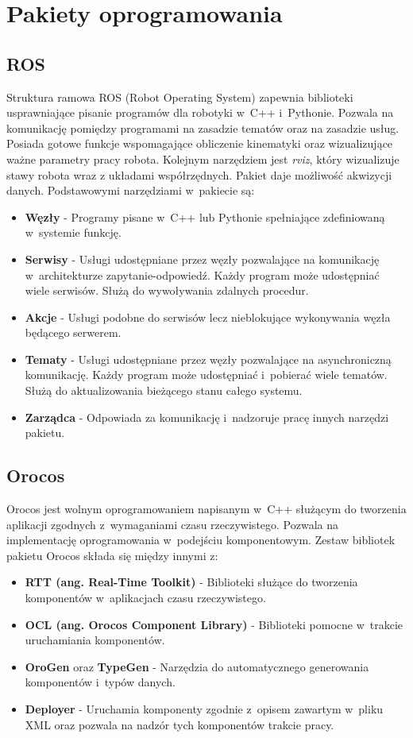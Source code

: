 	\section{Pakiety oprogramowania}
	\subsection{ROS}
	Struktura ramowa ROS (Robot Operating System)\cite{bib:ROS} zapewnia biblioteki usprawniające pisanie programów dla robotyki w~C++ i~Pythonie. Pozwala na komunikację pomiędzy programami na zasadzie tematów oraz na zasadzie usług. Posiada gotowe funkcje wspomagające obliczenie kinematyki oraz wizualizujące ważne parametry pracy robota. Kolejnym narzędziem jest \textit{rviz}, który wizualizuje stawy robota wraz z układami współrzędnych. Pakiet daje możliwość akwizycji danych. Podstawowymi narzędziami w~pakiecie są:
	\begin{itemize}
		\item \textbf{Węzły} - Programy pisane w~C++ lub Pythonie spełniające zdefiniowaną w~systemie funkcję.
		\item \textbf{Serwisy} - Usługi udostępniane przez węzły pozwalające na komunikację w~architekturze zapytanie-odpowiedź. Każdy program może udostępniać wiele serwisów. Służą do wywoływania zdalnych procedur.
		\item \textbf{Akcje} - Usługi podobne do serwisów lecz nieblokujące wykonywania węzła będącego serwerem.
		\item \textbf{Tematy} - Usługi udostępniane przez węzły pozwalające na asynchroniczną komunikację. Każdy program może udostępniać i~pobierać wiele tematów. Służą do aktualizowania bieżącego stanu całego systemu.
		\item \textbf{Zarządca} - Odpowiada za komunikację i~nadzoruje pracę innych narzędzi pakietu.
	\end{itemize}
	\subsection{Orocos}
	Orocos \cite{bib:Orocos} jest wolnym oprogramowaniem napisanym w~C++ służącym do tworzenia aplikacji zgodnych z~wymaganiami czasu rzeczywistego. Pozwala na implementację  oprogramowania w~podejściu komponentowym. Zestaw bibliotek pakietu Orocos składa się między innymi z:
	\begin{itemize}
		\item \textbf{RTT (ang. Real-Time Toolkit)} - Biblioteki służące do  tworzenia komponentów w~aplikacjach czasu rzeczywistego.
		\item \textbf{OCL (ang. Orocos Component Library)} - Biblioteki pomocne w~trakcie uruchamiania komponentów.
		\item \textbf{OroGen} oraz \textbf{TypeGen} - Narzędzia do automatycznego generowania komponentów i~typów danych.
		\item \textbf{Deployer} - Uruchamia komponenty zgodnie z~opisem zawartym w~pliku XML oraz pozwala na nadzór tych komponentów trakcie pracy.
	\end{itemize}

